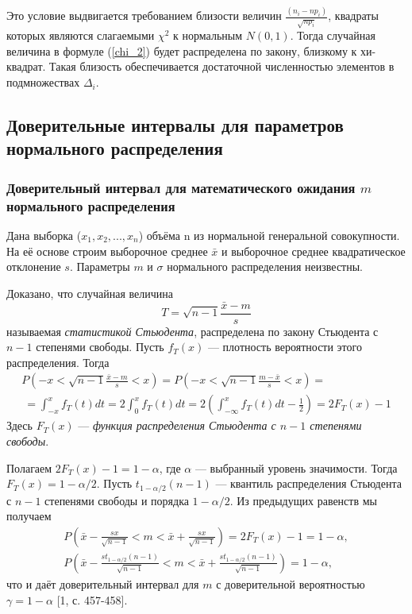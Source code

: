 \documentclass[12pt]{article}
\begin{document}
	Это условие выдвигается требованием близости величин $\frac{(n_{i} -np_{i})}{\sqrt{np_{i}}}$, квадраты которых являются слагаемыми $\chi^{2}$  к нормальным $N(0,1)$. Тогда случайная величина в формуле (\ref{chi_2}) будет распределена по закону, близкому к хи-квадрат. Такая близость обеспечивается достаточной численностью элементов в подмножествах $\Delta_{i}$.
	\subsection{Доверительные интервалы для параметров нормального распределения}
	\subsubsection{Доверительный интервал для математического ожидания $m$ нормального распределения}
	Дана выборка ($x_{1},x_{2}, ... ,x_{n}$) объёма n из нормальной генеральной совокупности. На её основе строим выборочное среднее $\bar{x}$ и выборочное среднее квадратическое отклонение $s$. Параметры $m$ и $\sigma$ нормального распределения неизвестны.
	
	Доказано, что случайная величина
	\begin{equation}
		T = \sqrt{n - 1}\frac{\bar{x} - m}{s}
		\label{T}
	\end{equation}
	называемая \textit{статистикой Стьюдента}, распределена по закону Стьюдента с $n-1$ степенями свободы. Пусть $f_{T}(x)$ — плотность вероятности этого распределения. Тогда 
	\begin{multline}
		P\left(-x < \sqrt{n - 1}\frac{\bar{x} - m}{s} < x \right) = 
		P\left(-x < \sqrt{n - 1}\frac{m - \bar{x}}{s} < x \right) = \\\
		= \int_{-x}^{x}{f_{T}(t)d t} = 2 \int_{0}^{x}{f_{T}(t)d t} = 
		2\left(  \int_{-\infty}^{x}{f_{T}(t)d t} - \frac{1}{2} \right) = 2F_{T}(x) - 1
		\label{P_f_t}
	\end{multline}
	Здесь $F_{T}(x)$ — \textit{функция распределения Стьюдента с $n-1$ степенями свободы}.
	
	Полагаем $2F_{T}(x)-1 = 1-\alpha$, где $\alpha$ — выбранный уровень значимости. Тогда $F_{T}(x) = 1-\alpha/2$. Пусть $t_{1-\alpha/2}(n-1)$ — квантиль распределения Стьюдента с $n-1$ степенями свободы и порядка $1-\alpha/2$. Из предыдущих равенств мы получаем 
	\begin{equation}
		\begin{gathered} \label{P_m}
			P\left(\bar{x} - \frac{sx}{\sqrt{n-1}} < m <  \bar{x} + \frac{sx}{\sqrt{n-1}}\right) = 2F_{T}(x) -1 = 1 -\alpha,  \\
			P\left(\bar{x} - \frac{st_{1-\alpha/2}(n-1)}{\sqrt{n-1}} < m <  \bar{x} + \frac{st_{1-\alpha/2}(n-1)}{\sqrt{n-1}}\right)= 1  -\alpha,
		\end{gathered}
	\end{equation}
	что и даёт доверительный интервал для $m$ с доверительной вероятностью $\gamma = 1-\alpha$ [1, с. 457-458].
	
\end{document}
